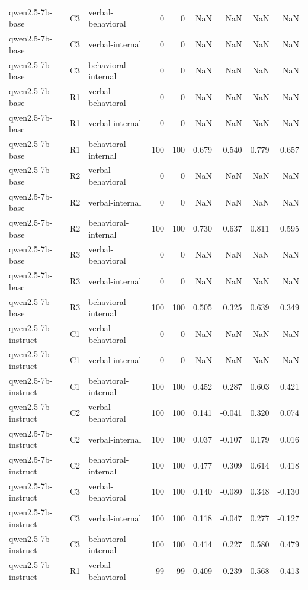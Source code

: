 \begin{table}
\begin{tabular}{lllrrrrrr}
qwen2.5-7b-base & C3 & verbal-behavioral & 0 & 0 & NaN & NaN & NaN & NaN \\
qwen2.5-7b-base & C3 & verbal-internal & 0 & 0 & NaN & NaN & NaN & NaN \\
qwen2.5-7b-base & C3 & behavioral-internal & 0 & 0 & NaN & NaN & NaN & NaN \\
qwen2.5-7b-base & R1 & verbal-behavioral & 0 & 0 & NaN & NaN & NaN & NaN \\
qwen2.5-7b-base & R1 & verbal-internal & 0 & 0 & NaN & NaN & NaN & NaN \\
qwen2.5-7b-base & R1 & behavioral-internal & 100 & 100 & 0.679 & 0.540 & 0.779 & 0.657 \\
qwen2.5-7b-base & R2 & verbal-behavioral & 0 & 0 & NaN & NaN & NaN & NaN \\
qwen2.5-7b-base & R2 & verbal-internal & 0 & 0 & NaN & NaN & NaN & NaN \\
qwen2.5-7b-base & R2 & behavioral-internal & 100 & 100 & 0.730 & 0.637 & 0.811 & 0.595 \\
qwen2.5-7b-base & R3 & verbal-behavioral & 0 & 0 & NaN & NaN & NaN & NaN \\
qwen2.5-7b-base & R3 & verbal-internal & 0 & 0 & NaN & NaN & NaN & NaN \\
qwen2.5-7b-base & R3 & behavioral-internal & 100 & 100 & 0.505 & 0.325 & 0.639 & 0.349 \\
qwen2.5-7b-instruct & C1 & verbal-behavioral & 0 & 0 & NaN & NaN & NaN & NaN \\
qwen2.5-7b-instruct & C1 & verbal-internal & 0 & 0 & NaN & NaN & NaN & NaN \\
qwen2.5-7b-instruct & C1 & behavioral-internal & 100 & 100 & 0.452 & 0.287 & 0.603 & 0.421 \\
qwen2.5-7b-instruct & C2 & verbal-behavioral & 100 & 100 & 0.141 & -0.041 & 0.320 & 0.074 \\
qwen2.5-7b-instruct & C2 & verbal-internal & 100 & 100 & 0.037 & -0.107 & 0.179 & 0.016 \\
qwen2.5-7b-instruct & C2 & behavioral-internal & 100 & 100 & 0.477 & 0.309 & 0.614 & 0.418 \\
qwen2.5-7b-instruct & C3 & verbal-behavioral & 100 & 100 & 0.140 & -0.080 & 0.348 & -0.130 \\
qwen2.5-7b-instruct & C3 & verbal-internal & 100 & 100 & 0.118 & -0.047 & 0.277 & -0.127 \\
qwen2.5-7b-instruct & C3 & behavioral-internal & 100 & 100 & 0.414 & 0.227 & 0.580 & 0.479 \\
qwen2.5-7b-instruct & R1 & verbal-behavioral & 99 & 99 & 0.409 & 0.239 & 0.568 & 0.413 \\

\end{tabular}
\end{table}
